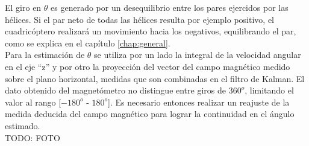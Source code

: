 \documentclass[main]{subfiles}
\begin{document}
El giro en $\theta$ es generado por un desequilibrio entre los pares ejercidos por las hélices. Si el par neto de todas las hélices resulta por ejemplo positivo, el cuadricóptero realizará un movimiento hacia los negativos, equilibrando el par, como se explica en el capítulo \ref{chap:general}.\\

Para la estimación de $\theta$ se utiliza por un lado la integral de la velocidad angular en el eje ``z'' y por otro la proyección del vector del campo magnético medido sobre el plano horizontal, medidas que son combinadas en el filtro de Kalman. El dato obtenido del magnetómetro no distingue entre giros de $360^o$, limitando el valor al rango [$-180^o$ - $180^o$]. Es necesario entonces realizar un reajuste de la medida deducida del campo magnético para lograr la continuidad en el ángulo estimado.\\

TODO: FOTO
\end{document}
